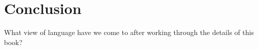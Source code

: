 \chapter*{Conclusion}
\label{ch:conclusion}

What view of language have we come to after working through the
details of this book?

